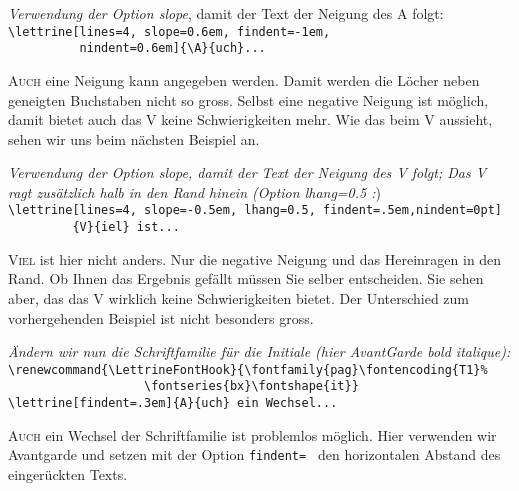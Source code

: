 \documentclass[a4paper,12pt,german]{article}
\begin{document}
\vspace{.5\baselineskip}
\textit{Verwendung der Option {\ttfamily\upshape slope}}, damit der Text
der Neigung des {\glqq}A{\grqq} folgt:\\
\verb+\lettrine[lines=4, slope=0.6em, findent=-1em,+\\
\verb+          nindent=0.6em]{\A}{uch}...+

\lettrine[lines=4, slope=0.6em, findent=-1em, nindent=0.6em]{A}{uch} eine
Neigung kann angegeben werden. Damit werden die Löcher neben geneigten
Buchstaben nicht so gross. Selbst eine negative Neigung ist möglich, damit
bietet auch das {\glqq}V{\grqq} keine Schwierigkeiten mehr. Wie das beim
{\glqq}V{\grqq} aussieht, sehen wir uns beim nächsten Beispiel an.

\vspace{.5\baselineskip}
\textit{Verwendung der Option {\ttfamily\upshape slope}, damit der Text
der Neigung des {\ttfamily\upshape V} folgt; Das {\ttfamily\upshape V} ragt
zusätzlich halb in den Rand hinein
(Option {\ttfamily\upshape lhang=0.5} :})\\
\verb+\lettrine[lines=4, slope=-0.5em, lhang=0.5, findent=.5em,nindent=0pt]+\\
\verb+         {V}{iel} ist...+

\lettrine[lines=4, slope=-0.5em, lhang=0.5, findent=.5em, nindent=0pt]{V}{iel}
ist hier nicht anders. Nur die negative Neigung und das Hereinragen in den
Rand. Ob Ihnen das Ergebnis gefällt müssen Sie selber entscheiden.
Sie sehen aber, das das {\glqq}V{\grqq} wirklich keine Schwierigkeiten bietet.
Der Unterschied zum vorhergehenden Beispiel ist nicht besonders gross.

\vspace{.5\baselineskip}
\textit{Ändern wir nun die Schriftfamilie für die Initiale
(hier AvantGarde bold italique):}\\
\verb+\renewcommand{\LettrineFontHook}{\fontfamily{pag}\fontencoding{T1}%+\\
\verb+                   \fontseries{bx}\fontshape{it}}+\\
\verb+\lettrine[findent=.3em]{A}{uch} ein Wechsel...+

{%
\renewcommand{\LettrineFontHook}{\fontfamily{pag}\fontencoding{T1}\fontseries{bx}\fontshape{it}}

\lettrine[findent=.3em]{A}{uch} ein Wechsel der Schriftfamilie ist problemlos
möglich. Hier verwenden wir Avantgarde und setzen mit der Option
\verb+findent= + den horizontalen Abstand des eingerückten Texts.
\par}
\end{document}
